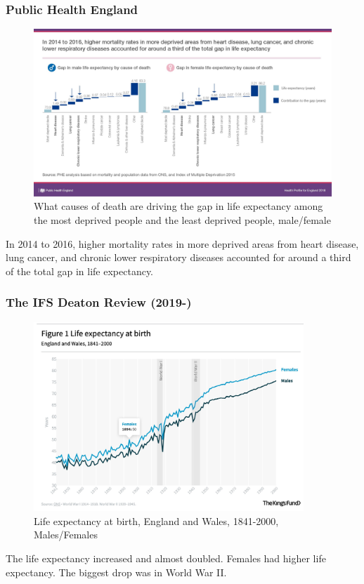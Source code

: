         \subsubsection{Public Health England}
            \begin{figure}[H]
                \centering
                \includegraphics[width=5in]{images/ch3/30.png}
                \caption{What causes of death are driving the gap in life expectancy among the most deprived people and the least deprived people, male/female}
            \end{figure}
          In 2014 to 2016, higher mortality rates in more deprived areas from heart disease, lung cancer, and chronic lower respiratory diseases accounted for around a third of the total gap in life expectancy.
        
        \subsubsection{The IFS Deaton Review (2019-)}
            \begin{figure}[H]
                \centering
                \includegraphics[width=4in]{images/ch3/31.png}
                \caption{Life expectancy at birth, England and Wales, 1841-2000, Males/Females}
            \end{figure}
            The life expectancy increased and almost doubled. Females had higher life expectancy. The biggest drop was in World War II.
         
